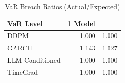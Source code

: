\begin{table}
\caption{VaR Breach Ratios (Actual/Expected)}
\label{tab:breach_analysis}
\begin{tabular}{lrr}
\toprule
VaR Level & 1%
Model &  &  \\
\midrule
DDPM & 1.000 & 1.000 \\
GARCH & 1.143 & 1.027 \\
LLM-Conditioned & 1.000 & 1.000 \\
TimeGrad & 1.000 & 1.000 \\
\bottomrule
\end{tabular}
\end{table}
